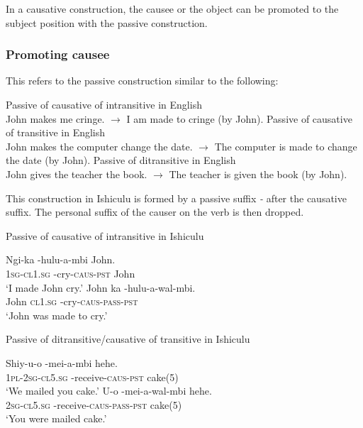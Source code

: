 In a causative construction, the causee or the object can be promoted to the subject position with the passive construction.

\subsubsection{Promoting causee}

This refers to the passive construction similar to the following:

\begin{exe}
\ex Passive of causative of intransitive in English \\
John makes me cringe. $\rightarrow$ I am made to cringe (by John).
\ex Passive of causative of transitive in English \\
John makes the computer change the date. $\rightarrow$ The computer is made to change the date (by John).
\ex Passive of ditransitive in English \\
John gives the teacher the book. $\rightarrow$ The teacher is given the book (by John).
\end{exe}

This construction in Ishiculu is formed by a passive suffix \textit{-} after the causative suffix. The personal suffix of the causer on the verb is then dropped.

\begin{exe}
\ex Passive of causative of intransitive in Ishiculu
\begin{xlist}
\ex
\gll Ngi-ka -hulu-\textbeltl a-mbi John. \\
\textsc{1sg}-\textsc{cl1.sg} -cry-\textsc{caus}-\textsc{pst} John \\
\trans `I made John cry.'
\ex
\gll John ka -hulu-\textbeltl a-wal\textramshorns-mbi. \\
John \textsc{cl1.sg} -cry-\textsc{caus}-\textsc{pass}-\textsc{pst} \\
\trans `John was made to cry.'
\end{xlist}
\ex Passive of ditransitive/causative of transitive in Ishiculu
\begin{xlist}
\ex
\gll Shiy-u-\textbeltl o -me\textbeltl i-\textbeltl a-mbi hehe. \\
\textsc{1pl}-\textsc{2sg}-\textsc{cl5.sg} -receive-\textsc{caus}-\textsc{pst} cake(5) \\
\trans `We mailed you cake.'
\ex
\gll U-\textbeltl o -me\textbeltl i-\textbeltl a-wal\textramshorns-mbi hehe. \\
\textsc{2sg}-\textsc{cl5.sg} -receive-\textsc{caus}-\textsc{pass}-\textsc{pst} cake(5) \\
\trans `You were mailed cake.'
\end{xlist}
\end{exe}

